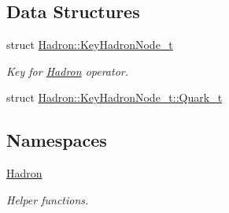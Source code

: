 \subsection*{Data Structures}
\begin{DoxyCompactItemize}
\item 
struct \mbox{\hyperlink{structHadron_1_1KeyHadronNode__t}{Hadron\+::\+Key\+Hadron\+Node\+\_\+t}}
\begin{DoxyCompactList}\small\item\em Key for \mbox{\hyperlink{namespaceHadron}{Hadron}} operator. \end{DoxyCompactList}\item 
struct \mbox{\hyperlink{structHadron_1_1KeyHadronNode__t_1_1Quark__t}{Hadron\+::\+Key\+Hadron\+Node\+\_\+t\+::\+Quark\+\_\+t}}
\end{DoxyCompactItemize}
\subsection*{Namespaces}
\begin{DoxyCompactItemize}
\item 
 \mbox{\hyperlink{namespaceHadron}{Hadron}}
\begin{DoxyCompactList}\small\item\em Helper functions. \end{DoxyCompactList}\end{DoxyCompactItemize}

